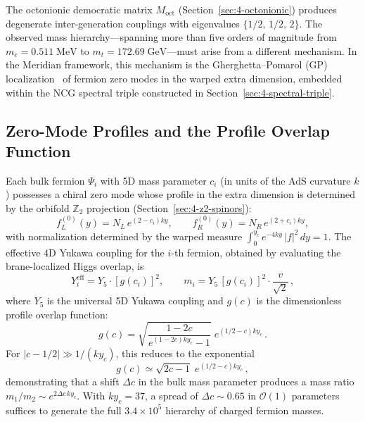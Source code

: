 The octonionic democratic matrix $M_{\mathrm{oct}}$ (Section~\ref{sec:4-octonionic}) produces degenerate inter-generation couplings with eigenvalues $\{1/2,\, 1/2,\, 2\}$. The observed mass hierarchy---spanning more than five orders of magnitude from $m_e = 0.511\;\mathrm{MeV}$ to $m_t = 172.69\;\mathrm{GeV}$---must arise from a different mechanism. In the Meridian framework, this mechanism is the Gherghetta--Pomarol (GP) localization~\cite{ch4:GherghettaPomarol2000} of fermion zero modes in the warped extra dimension, embedded within the NCG spectral triple constructed in Section~\ref{sec:4-spectral-triple}.

\subsection{Zero-Mode Profiles and the Profile Overlap Function}
\label{sec:4-zero-mode-profiles}

Each bulk fermion $\Psi_i$ with 5D mass parameter $c_i$ (in units of the AdS curvature $k$) possesses a chiral zero mode whose profile in the extra dimension is determined by the orbifold $\mathbb{Z}_2$ projection (Section~\ref{sec:4-z2-spinors}):
\begin{equation}
  f_L^{(0)}(y) = N_L\, e^{(2-c_i)ky}, \qquad
  f_R^{(0)}(y) = N_R\, e^{(2+c_i)ky},
  \label{eq:4-95}
\end{equation}
with normalization determined by the warped measure $\int_0^{y_c} e^{-4ky}\, |f|^2\, dy = 1$. The effective 4D Yukawa coupling for the $i$-th fermion, obtained by evaluating the brane-localized Higgs overlap, is
\begin{equation}
  Y_i^{\mathrm{eff}} = Y_5 \cdot [g(c_i)]^2, \qquad
  m_i = Y_5\, [g(c_i)]^2 \cdot \frac{v}{\sqrt{2}}\,,
  \label{eq:4-96}
\end{equation}
where $Y_5$ is the universal 5D Yukawa coupling and $g(c)$ is the dimensionless profile overlap function:
\begin{equation}
  g(c) = \sqrt{\frac{1 - 2c}{e^{(1-2c)ky_c} - 1}}\; e^{(1/2 - c)ky_c}\,.
  \label{eq:4-97}
\end{equation}
For $|c - 1/2| \gg 1/(ky_c)$, this reduces to the exponential
\begin{equation}
  g(c) \simeq \sqrt{2c - 1}\; e^{(1/2 - c)ky_c}\,,
  \label{eq:4-98}
\end{equation}
demonstrating that a shift $\Delta c$ in the bulk mass parameter produces a mass ratio $m_1/m_2 \sim e^{2\Delta c\, ky_c}$. With $ky_c = 37$, a spread of $\Delta c \sim 0.65$ in $\mathcal{O}(1)$ parameters suffices to generate the full $3.4 \times 10^5$ hierarchy of charged fermion masses.

